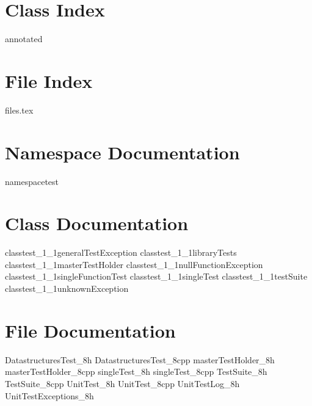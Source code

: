 
\renewcommand{\DOXYGENFOLDER}{../../UnitTest/Documentation/doxygenFiles/latex/}
	
	\chapter{Class Index}
		{annotated}
	\chapter{File Index}
		{files.tex}
	\chapter{Namespace Documentation}
		{namespacetest}
		
	\chapter{Class Documentation}
		{classtest_1_1generalTestException}
		{classtest_1_1libraryTests}
		{classtest_1_1masterTestHolder}
		{classtest_1_1nullFunctionException}
		{classtest_1_1singleFunctionTest}
		{classtest_1_1singleTest}
		{classtest_1_1testSuite}
		{classtest_1_1unknownException}
	
	\chapter{File Documentation}
		{DatastructuresTest_8h}
		{DatastructuresTest_8cpp}
		{masterTestHolder_8h}
		{masterTestHolder_8cpp}
		{singleTest_8h}
		{singleTest_8cpp}
		{TestSuite_8h}
		{TestSuite_8cpp}
		{UnitTest_8h}
		{UnitTest_8cpp}
		{UnitTestLog_8h}
		{UnitTestExceptions_8h}
		